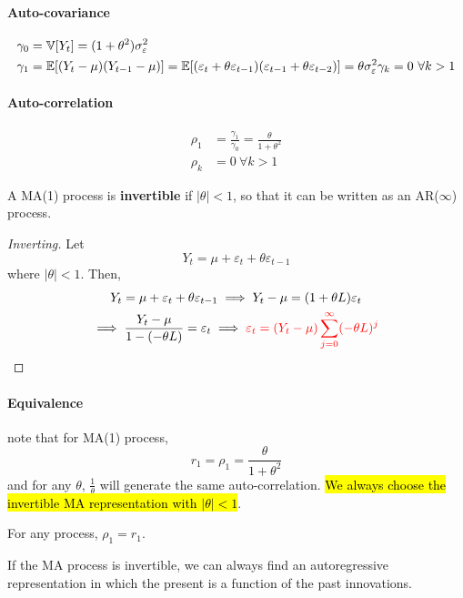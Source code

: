 \documentclass[11pt]{article}
\begin{document}
			\paragraph{Auto-covariance}
				\begin{align}
					\gamma_0 &= \mathbb{V}[{Y_t}] = (1 + \theta^2) \sigma_\varepsilon^2\\
					\gamma_1 &= \mathbb{E}[{(Y_t - \mu) (Y_{t-1} - \mu)}]
					= \mathbb{E}[{(\varepsilon_t + \theta \varepsilon_{t-1})(\varepsilon_{t-1} + \theta \varepsilon_{t-2})}]
					= \theta \sigma_\varepsilon^2
					\gamma_k = 0\ \forall k > 1
				\end{align}
			\paragraph{Auto-correlation}
				\begin{align}
					\rho_1 &= \frac{\gamma_1}{\gamma_0}
					= \frac{\theta}{1 + \theta^2} \\
					\rho_k &= 0\ \forall k > 1
				\end{align}
				
			\begin{definition}
				A MA(1) process is \textbf{invertible} if $|\theta| < 1$, so that it can be written as an AR($\infty$) process.
			\end{definition}
			\begin{proof}[Inverting]
				Let 
				\begin{equation}
					Y_t = \mu + \varepsilon_t + \theta \varepsilon_{t-1}
				\end{equation}
				where $|\theta| < 1$.
				Then, 
				\begin{gather}
					Y_t = \mu + \varepsilon_t + \theta \varepsilon_{t-1} 
					\implies Y_t - \mu = (1 + \theta L) \varepsilon_t \\ 
					\implies \frac{Y_t - \mu}{1 - (- \theta L)} = \varepsilon_t
					\implies \textcolor{red}{\varepsilon_t = (Y_t - \mu) \sum_{j=0}^\infty (-\theta L)^j}
				\end{gather}
			\end{proof}
			
			\paragraph{Equivalence} note that for MA(1) process,
				\begin{equation}
					r_1 = \rho_1 = \frac{\theta}{1 + \theta^2}
				\end{equation}
				and for any $\theta$, $\frac{1}{\theta}$ will generate the same auto-correlation. \hl{We always choose the invertible MA representation with $|\theta| < 1$}.
			\begin{proposition}
				For any process, $\rho_1 = r_1$.
			\end{proposition}
			\begin{remark}
				If the MA process is invertible, we can always find an autoregressive representation in which the present is a function of the past innovations.
			\end{remark}
			
\end{document}
